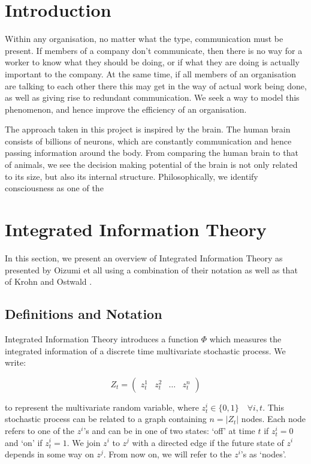 


\section{Introduction}
Within any organisation, no matter what the type, communication must be present. If members of a company don't communicate, then there is no way for a worker to know what they should be doing, or if what they are doing is actually important to the company. At the same time, if all members of an organisation are talking to each other there this may get in the way of actual work being done, as well as giving rise to redundant communication. We seek a way to model this phenomenon, and hence improve the efficiency of an organisation.

The approach taken in this project is inspired by the brain. The human brain consists of billions of neurons, which are constantly communication and hence passing information around the body. From comparing the human brain to that of animals, we see the decision making potential of the brain is not only related to its size, but also its internal structure. Philosophically, we identify consciousness as one of the 


\section{Integrated Information Theory}

In this section, we present an overview of Integrated Information Theory as presented by Oizumi et all \cite{oizumi2014phenomenology} using a combination of their notation as well as that of Krohn and Ostwald \cite{krohn2016computing}.

\subsection{Definitions and Notation}

Integrated Information Theory introduces a function $\Phi$ which measures the integrated information of a discrete time multivariate stochastic process. We write:

\begin{equation}
\label{def:1}
Z_t = \left(\begin{array}{cccc} z^1_t&z^2_t&\ldots&z^n_t\end{array}\right)
\end{equation}

to represent the multivariate random variable, where $z^i_t \in \{0,1\} \quad\forall i, t$. This stochastic process can be related to a graph containing $n = |Z_t|$ nodes. Each node refers to one of the $z^i$'s and can be in one of two states: `off' at time $t$ if $z^i_t=0$ and `on' if $z^i_t = 1$. We join $z^i$ to $z^j$ with a directed edge if the future state of $z^i$ depends in some way on $z^j$. From now on, we will refer to the $z^i$'s as `nodes'.

